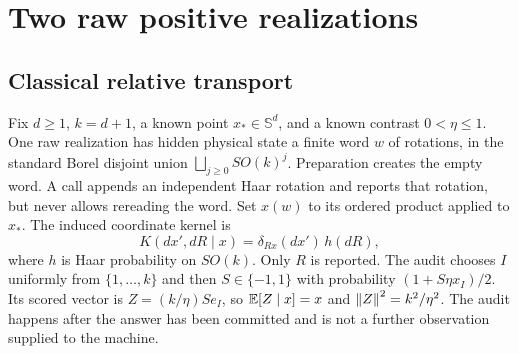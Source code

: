 \section{Two raw positive realizations}\label{sec:realizations}
\subsection{Classical relative transport}
Fix $d\ge1$, $k=d+1$, a known point $x_*\in\mathbb S^d$, and a known contrast $0<\eta\le1$. One raw realization has hidden physical state a finite word $w$ of rotations, in the standard Borel disjoint union $\bigsqcup_{j\ge0}SO(k)^j$. Preparation creates the empty word. A call appends an independent Haar rotation and reports that rotation, but never allows rereading the word. Set $x(w)$ to its ordered product applied to $x_*$. The induced coordinate kernel is
\begin{equation}\label{eq:classical-kernel}
 K(dx',dR\mid x)=\delta_{Rx}(dx')\,h(dR),
\end{equation}
where $h$ is Haar probability on $SO(k)$. Only $R$ is reported. The audit chooses $I$ uniformly from $\{1,\ldots,k\}$ and then $S\in\{-1,1\}$ with probability $(1+S\eta x_I)/2$. Its scored vector is $Z=(k/\eta)S e_I$, so $\mathbb E[Z\mid x]=x$ and $\left\lVert Z\right\rVert^2=k^2/\eta^2$. The audit happens after the answer has been committed and is not a further observation supplied to the machine.


